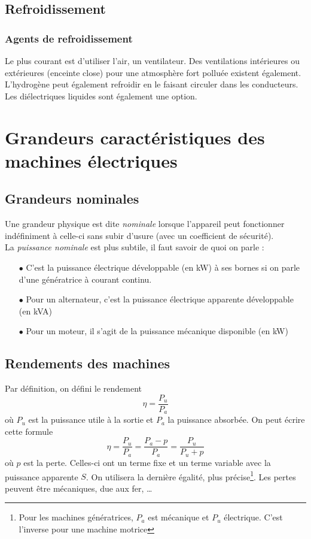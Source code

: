 	\subsection{Refroidissement}
		\subsubsection{Agents de refroidissement}
		Le plus courant est d'utiliser l'air, un ventilateur. Des ventilations 
		intérieures ou extérieures (enceinte close) pour une atmosphère fort 
		polluée existent également. L'hydrogène peut également refroidir en 
		le faisant circuler dans les conducteurs. Les diélectriques liquides 
		sont également une option.
		
\section{Grandeurs caractéristiques des machines électriques}
	\subsection{Grandeurs nominales}
	Une grandeur physique est dite \textit{nominale} lorsque l'appareil peut 
	fonctionner indéfiniment à celle-ci sans subir d'usure (avec un coefficient 
	de sécurité).\\
	La \textit{puissance nominale} est plus subtile, il faut savoir de quoi on 
	parle :
	\begin{itemize}
	\item[$\bullet$] C'est la puissance électrique développable (en kW) à ses 
	bornes si on parle d'une génératrice à courant continu.
	\item[$\bullet$] Pour un alternateur, c'est la puissance électrique 
	apparente développable (en kVA)
	\item[$\bullet$] Pour un moteur, il s'agit de la puissance mécanique 
	disponible (en kW)
	\end{itemize}
	
	
	\subsection{Rendements des machines}
	Par définition, on défini le rendement 
	\begin{equation}
	\eta = \frac{P_u}{P_a}
	\end{equation}
	où $P_u$ est la puissance utile à la sortie et $P_a$ la puissance 
	absorbée. On peut écrire cette formule
	\begin{equation}
	\eta = \frac{P_u}{P_a} = \frac{P_a-p}{P_a} = \frac{P_u}{P_u+p}
	\end{equation}
	où $p$ est la perte. Celles-ci ont un terme fixe et un terme variable avec 
	la puissance apparente $S$. On utilisera la dernière égalité, plus précise\footnote{
	Pour les machines génératrices, $P_a$ est mécanique et $P_u$ électrique. C'est 
	l'inverse pour 	une machine motrice}. Les pertes peuvent être mécaniques, 
	due aux fer, \dots\\
	
